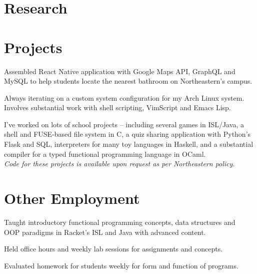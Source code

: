 \documentclass[letterpaper]{deedy-resume} %
\begin{document}
\begin{minipage}[t]{0.66\textwidth}
\sectionspace %

\section{Research}



\sectionspace %

\section{Projects}
Assembled React Native application with Google Maps API,
GraphQL and MySQL to help students locate the nearest bathroom
on Northeastern's campus.
\sectionspace

Always iterating on a custom system configuration for my Arch Linux system. \\
Involves substantial work with shell scripting, VimScript and Emacs Lisp.
\sectionspace

I've worked on lots of school projects -- including several games in ISL/Java,
a shell and FUSE-based file system in C,
a quiz sharing application with Python's Flask and SQL,
interpreters for many toy languages in Haskell,
and a substantial compiler for a typed functional programming language in OCaml. \\
\textit{Code for these projects is available upon request as per Northeastern policy.}
\sectionspace

\section{Other Employment}

Taught introductory functional programming concepts, data structures and \\
OOP paradigms in Racket's ISL and Java with advanced content.
\begin{tightitemize}
\item Held office hours and weekly lab sessions for assignments and concepts.
\item Evaluated homework for students weekly for form and function of programs.
\end{tightitemize}

\sectionspace %

\end{minipage} %
\end{document}
